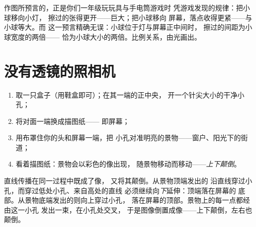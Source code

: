 \begin{example}[更大、更小、更清楚]\label{ex:g6:light-propagation:sizes}
作图所预言的，正是你们一年级玩玩具与手电筒游戏时
凭游戏发现的规律：把小球移向小灯，
擦过的张得更开——巨大；把小球移向
屏幕，落点收得更紧——与小球等大。而
这一预言精确无误：小球位于灯与屏幕正中间时，
擦过的间距为小球宽度的两倍——
恰为小球大小的两倍。比例关系，由光画出。
\end{example}

\section{没有透镜的照相机}

\begin{method}[制作针孔照相机]\label{met:g6:light-propagation:pinhole}
\begin{enumerate}
  \item 取一只盒子（用鞋盒即可）；在其一端的正中央，
        开一个针尖大小的干净小孔；
  \item 将对面一端换成描图纸——
        即屏幕；
  \item 用布罩住你的头和屏幕一端，把
        小孔对准明亮的景物——窗户、阳光下的街道；
  \item 看着描图纸：景物会以彩色的像出现，
        随景物移动而移动——\emph{上下颠倒}。
\end{enumerate}
\end{method}

\begin{proposition}[像为何上下颠倒]\label{prop:g6:light-propagation:inverted}
直线传播在同一过程中既成了像，
又将其颠倒。从景物顶端发出的
沿直线穿过小孔，而穿过低处小孔、来自高处的直线
必须继续向\emph{下}延伸：顶端落在屏幕的
底部。从景物底端发出的则向上穿过小孔，
落在屏幕的顶部。景物上的每一点都经由这一小孔
发出一束，在小孔处交叉，
于是图像倒置成像——上下颠倒，左右也颠倒。
\end{proposition}

